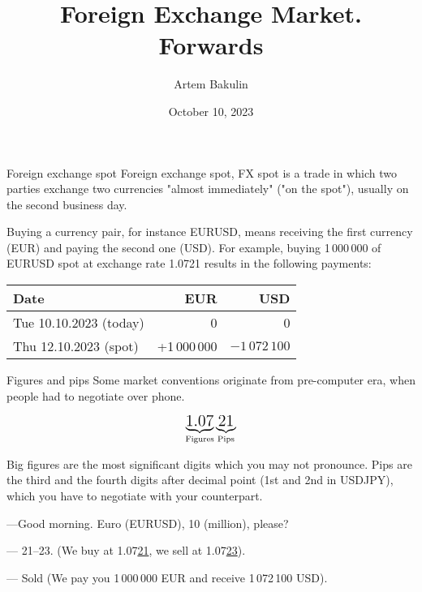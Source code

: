 \documentclass{beamer}
\title{Foreign Exchange Market. Forwards}
\author{Artem Bakulin}
\date{October 10, 2023}
\begin{document}
\begin{frame}
\titlepage
\end{frame}



\begin{frame}{Foreign exchange spot}
\justify
\alert{Foreign exchange spot, FX spot} is a trade in which two parties exchange two currencies "almost immediately" ("on the spot"), usually on the second business day.

\justify
Buying a currency pair, for instance EURUSD, means receiving the first currency (EUR) and paying the second one (USD). For example, buying 1\,000\,000 of EURUSD spot at exchange rate 1.0721 results in the following payments:
\justify

\centering
\begin{tabular}{l|r|r}
Date                          & EUR & USD \\ \hline
Tue 10.10.2023 (today)  & 0   & 0   \\
Thu 12.10.2023 (spot)     & +1\,000\,000 & $-1\,072\,100$
\end{tabular}
\end{frame}



\begin{frame}{Figures and pips}
\justify
Some market conventions originate from pre-computer era, when people had to negotiate
over phone.

\begin{align*}
\underbrace{\text{\Large 1.07}}_{\text{Figures}}\underbrace{\text{\Large 21}}_{\text{Pips}}
\end{align*}
\justify

\alert{Big figures} are  the most significant digits which you may not pronounce. \alert{Pips} are the third and the fourth digits after decimal point  (1st and 2nd in USDJPY), which you have to negotiate with your counterpart.

\justify
---Good morning. Euro (EURUSD), 10 (million), please?

--- 21--23. (We buy at 1.07\underline{21}, we sell at 1.07\underline{23}).

--- Sold (We pay you 1\,000\,000 EUR and receive 1\,072\,100 USD).
\end{frame}
\end{document}
